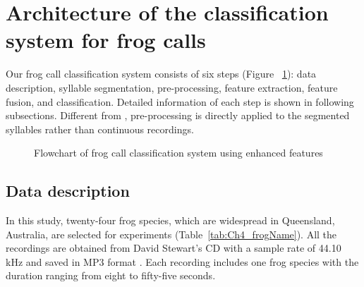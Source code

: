 \section{Architecture of the classification system for frog calls}
Our frog call classification system consists of six steps (Figure~ \ref{fig:Ch4_flowchart}): data description, syllable segmentation, pre-processing,  feature extraction, feature fusion, and classification. Detailed information of each step is shown in following subsections. Different from \citep{huang2009frog}, pre-processing is directly applied to the segmented syllables rather than continuous recordings.

\begin{figure}[htb!] %
\caption{Flowchart of frog call classification system using enhanced features}
\label{fig:Ch4_flowchart} 
\end{figure}


\subsection{Data description}
In this study, twenty-four frog species, which are widespread in Queensland, Australia, are selected for experiments (Table~\ref{tab:Ch4_frogName}). All the recordings are obtained from David Stewart's CD with a sample rate of 44.10 kHz and saved in MP3 format \citep{CD}. Each recording includes one frog species with the duration ranging from eight to fifty-five seconds.

